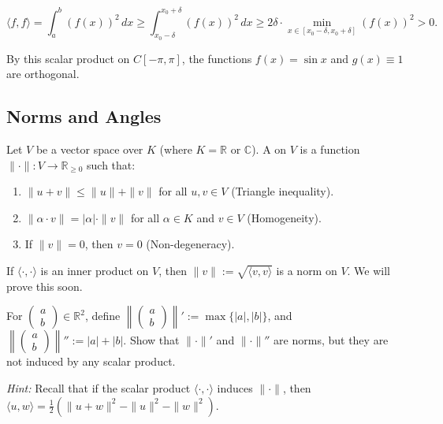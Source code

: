 \begin{equation*}
    \langle f, f \rangle = \int_a^b (f(x))^2 \, dx \geq \int_{x_0 - \delta}^{x_0 + \delta} (f(x))^2 \, dx \geq 2\delta \cdot \min_{x \in [x_0-\delta, x_0+\delta]} (f(x))^2 > 0.
\end{equation*}

\begin{remark}
    By this scalar product on $C[-\pi, \pi]$, the functions $f(x) = \sin x$ and $g(x) \equiv 1$ are orthogonal.
\end{remark}

\subsection{Norms and Angles}

\begin{definition}[Norm]
    Let $V$ be a vector space over $K$ (where $K = \mathbb{R}$ or $\mathbb{C}$). A  on $V$ is a function $\| \cdot \|: V \to \mathbb{R}_{\geq 0}$ such that:
    \begin{enumerate}
        \item $\|u + v\| \leq \|u\| + \|v\|$ for all $u, v \in V$ (Triangle inequality).
        \item $\|\alpha \cdot v\| = |\alpha| \cdot \|v\|$ for all $\alpha \in K$ and $v \in V$ (Homogeneity).
        \item If $\|v\| = 0$, then $v = 0$ (Non-degeneracy).
    \end{enumerate}
\end{definition}

\begin{claim*}
    If $\langle \cdot, \cdot \rangle$ is an inner product on $V$, then $\|v\| := \sqrt{\langle v, v \rangle}$ is a norm on $V$. We will prove this soon.
\end{claim*}

\begin{exercise}
    For $\left(\begin{smallmatrix} a \\ b \end{smallmatrix}\right) \in \mathbb{R}^2$, define $\left\| \left(\begin{smallmatrix} a \\ b \end{smallmatrix}\right) \right\|' := \max\{|a|, |b|\}$, and $\left\| \left(\begin{smallmatrix} a \\ b \end{smallmatrix}\right) \right\|'' := |a| + |b|$. 
    Show that $\| \cdot \|'$ and $\| \cdot \|''$ are norms, but they are not induced by any scalar product. 
    
    \textit{Hint:} Recall that if the scalar product $\langle \cdot, \cdot \rangle$ induces $\| \cdot \|$, then $\langle u, w \rangle = \frac{1}{2} (\|u + w\|^2 - \|u\|^2 - \|w\|^2)$.
\end{exercise}

